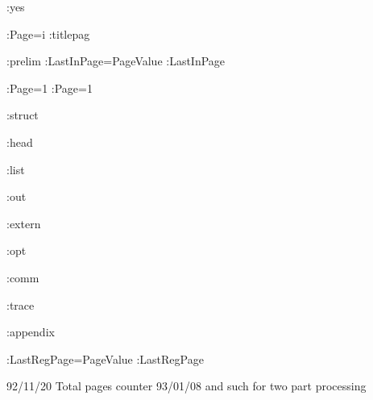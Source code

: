 %
%
%
%
%
%
\makeatletter
\makeatother
{}


%
\def\SerifFace{\TypeFace:ComputerModern }
\def\SansFace{\TypeFace:ComputerSans }
\comment
\def\SerifFace{\TypeFace:macTimes }
\def\SansFace{\TypeFace:macHelvetica }
\def\SerifFace{\TypeFace:unixTimes }
\def\SansFace{\TypeFace:unixHelvetica }
\endcomment 



\WriteExtern:yes



\Start


\CounterRepresentation:Page=i \RightPage
\InputFile:titlepag

\InputFile:prelim
\SetCounter:LastInPage=PageValue
\BackStepCounter:LastInPage

\ToRecto\RightPage
\CounterRepresentation:Page=1 \SetCounter:Page=1

\InputFile:struct

\InputFile:head

\InputFile:list


\InputFile:out

\InputFile:extern

\InputFile:opt

\InputFile:comm

\InputFile:trace

\InputFile:appendix

\SetCounter:LastRegPage=PageValue
\BackStepCounter:LastRegPage
\Stop

92/11/20 Total pages counter
93/01/08 \comment and such for two part processing
